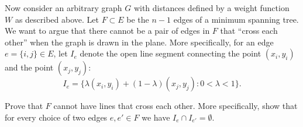 Now consider an arbitrary graph $G$ with distances defined by a weight function $W$ as described above.
Let $F \subset E$ be the $n-1$ edges of a minimum spanning tree. We want to argue that there cannot be a pair of edges in $F$ that ``cross each other'' when the graph is drawn in the plane.
More specifically, for an edge $e = \{i,j\} \in E$, let $I_e$ denote the open line segment connecting the point $(x_i,y_i)$ and the point $(x_j,y_j)$:
$$I_e = \{ \lambda (x_i,y_i)+(1-\lambda) (x_j,y_j) : 0 < \lambda < 1\}.$$

{Prove that $F$ cannot have lines that cross each other. More specifically, show that for every choice of two edges $e,e' \in F$ we have $I_e \cap I_{e'} = \emptyset$.}






\label{page:last}
